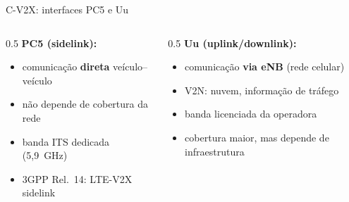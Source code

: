 \documentclass[aspectratio=169,11pt]{beamer}
\begin{document}
\begin{frame}{C-V2X: interfaces PC5 e Uu}
  \begin{columns}
    \begin{column}{0.5\textwidth}
      \textbf{PC5 (sidelink):}
      \begin{itemize}
        \item comunicação \textbf{direta} veículo--veículo
        \item não depende de cobertura da rede
        \item banda ITS dedicada (5,9~GHz)
        \item 3GPP Rel.~14: LTE-V2X sidelink
      \end{itemize}
    \end{column}
    \begin{column}{0.5\textwidth}
      \textbf{Uu (uplink/downlink):}
      \begin{itemize}
        \item comunicação \textbf{via eNB} (rede celular)
        \item V2N: nuvem, informação de tráfego
        \item banda licenciada da operadora
        \item cobertura maior, mas depende de infraestrutura
      \end{itemize}
    \end{column}
  \end{columns}
  \begin{center}
  \end{center}
\end{frame}
\end{document}
